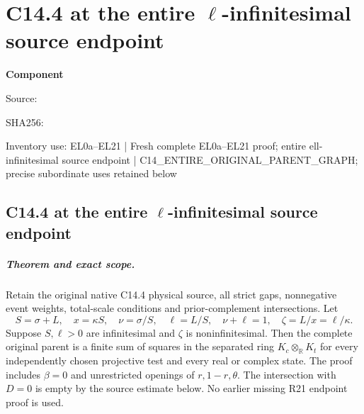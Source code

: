 \chapter{C14.4 at the entire $\ell$-infinitesimal source endpoint}
\label{component:pb96c9bfcc12d}
\noindent\textbf{Component }\par
{\small\noindent Source: \par}
{\small\noindent SHA256: \par}
{\small\noindent Inventory use: EL0a--EL21 | Fresh complete EL0a–EL21 proof; entire ell-infinitesimal source endpoint | C14\_\allowbreak{}ENTIRE\_\allowbreak{}ORIGINAL\_\allowbreak{}PARENT\_\allowbreak{}GRAPH; precise subordinate uses retained below\par}
\medskip
\section{C14.4 at the entire $\ell$-infinitesimal source endpoint}
\label{pb96c9bfcc12d:sec:c144-ell-endpoint-rederived}

\paragraph{Theorem and exact scope.}
Retain the original native C14.4 physical source, all strict gaps,
nonnegative event weights, total-scale conditions and prior-complement
intersections.  Let
\[
 S=\sigma+L,\quad x=\kappa S,\quad
 \nu=\sigma/S,\quad\ell=L/S,\quad\nu+\ell=1,
 \quad\zeta=L/x=\ell/\kappa.
\]
Suppose $S,\ell>0$ are infinitesimal and $\zeta$ is
noninfinitesimal.  Then the complete original parent is a finite
sum of squares in the separated ring
$K_c\otimes_{\mathbb R}K_t$ for every independently chosen
projective test and every real or complex state.  The proof includes
$\beta=0$ and unrestricted openings of $r,1-r,\theta$.
The intersection with $D=0$ is empty by the source estimate below.
No earlier missing R21 endpoint proof is used.

